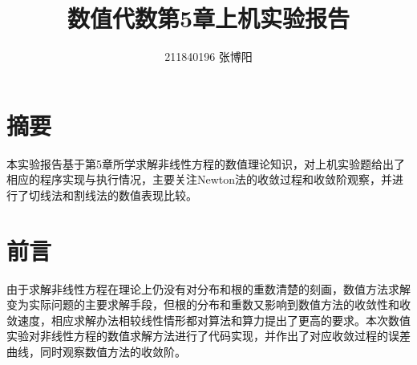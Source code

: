 \documentclass[UTF8,a4paper,10pt]{ctexart}
\title{\textbf{数值代数第5章上机实验报告}}
\author{ 211840196 张博阳 }
\date{}
\begin{document}
    \maketitle
 
    \section*{摘要}
        \par
        本实验报告基于第5章所学求解非线性方程的数值理论知识，对上机实验题给出了相应的程序实现与执行情况，主要关注Newton法的收敛过程和收敛阶观察，并进行了切线法和割线法的数值表现比较。

    \section{前言}
        \par
        由于求解非线性方程在理论上仍没有对分布和根的重数清楚的刻画，数值方法求解变为实际问题的主要求解手段，但根的分布和重数又影响到数值方法的收敛性和收敛速度，相应求解办法相较线性情形都对算法和算力提出了更高的要求。本次数值实验对非线性方程的数值求解方法进行了代码实现，并作出了对应收敛过程的误差曲线，同时观察数值方法的收敛阶。
        
\end{document}
